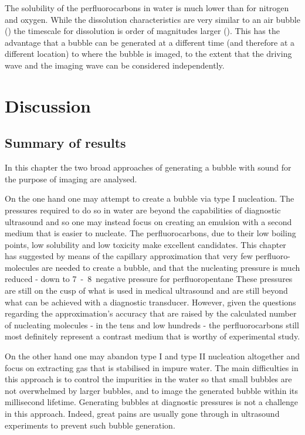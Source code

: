The solubility of the perfluorocarbons in water is much lower than for nitrogen and oxygen.
While the dissolution characteristics are very similar to an air bubble ()
the timescale for dissolution is order of magnitudes larger ().
This has the advantage that a bubble can be generated at a different time (and therefore at a different location)
to where the bubble is imaged, to the extent that the driving wave and the imaging wave can be considered independently.

\section{Discussion}\label{sec:nuc:discussion}

\subsection{Summary of results}

In this chapter the two broad approaches of generating a bubble with sound for the purpose of imaging are analysed.

On the one hand one may attempt to create a bubble via type I nucleation.
The pressures required to do so in water are beyond the capabilities of diagnostic ultrasound
and so one may instead focus on creating an emulsion with a second medium that is easier to nucleate.
The perfluorocarbons, due to their low boiling points, low solubility and low toxicity make excellent 
candidates.
This chapter has suggested by means of the capillary approximation that very few perfluoro-molecules are 
needed to create a bubble, and that the nucleating pressure is much reduced - down to \unit{7-8}\mega\pascal\ negative pressure for
perfluoropentane
These pressures are still on the cusp of what is used in medical ultrasound
and are still beyond what can be achieved with a diagnostic transducer.
However, given the questions regarding the approximation's accuracy that are raised by the calculated number of nucleating molecules 
- in the tens and low hundreds - 
the perfluorocarbons still most definitely represent a contrast medium that is worthy of experimental study.

On the other hand one may abandon type I and type II nucleation altogether and focus on extracting gas that is stabilised in impure water.
The main difficulties in this approach is to control the impurities in the water so that small bubbles are not overwhelmed by larger bubbles,
and to image the generated bubble within its millisecond lifetime.
Generating bubbles at diagnostic pressures is not a challenge in this approach.
Indeed, great pains are usually gone through in ultrasound experiments to prevent such bubble generation.


